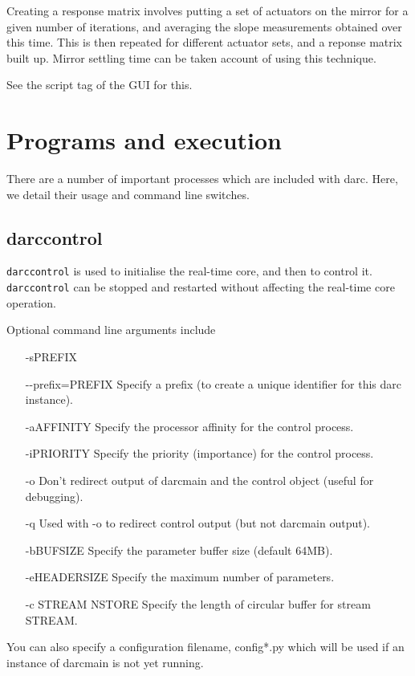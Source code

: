 \documentclass[a4,10pt]{article}
\begin{document}
Creating a response matrix involves putting a set of actuators on the
mirror for a given number of iterations, and averaging the slope
measurements obtained over this time.  This is then repeated for
different actuator sets, and a reponse matrix built up.  Mirror
settling time can be taken account of using this technique.

See the script tag of the GUI for this.

\section{Programs and execution}
There are a number of important processes which are included with
darc.  Here, we detail their usage and command line switches.

\subsection{darccontrol}
{\tt darccontrol} is used to initialise the real-time core, and then to
control it.  {\tt darccontrol} can be stopped and restarted without affecting
the real-time core operation.

Optional command line arguments include
\begin{center}
\begin{itemize}
\item[-sPREFIX]
\item[-{-}prefix=PREFIX] Specify a prefix (to create a unique
  identifier for this darc instance).
\item[-aAFFINITY] Specify the processor affinity for the control
  process.
\item[-iPRIORITY] Specify the priority (importance) for the control
  process.
\item[-o] Don't redirect output of darcmain and the control object
  (useful for debugging).
\item[-q] Used with -o to redirect control output (but not darcmain
  output).
\item[-bBUFSIZE] Specify the parameter buffer size (default 64MB).
\item[-eHEADERSIZE] Specify the maximum number of parameters.
\item[-c STREAM NSTORE] Specify the length of circular buffer for
stream STREAM.
\end{itemize}
\end{center}
You can also specify a configuration filename, config*.py which will
be used if an instance of darcmain is not yet running.
\end{document}
